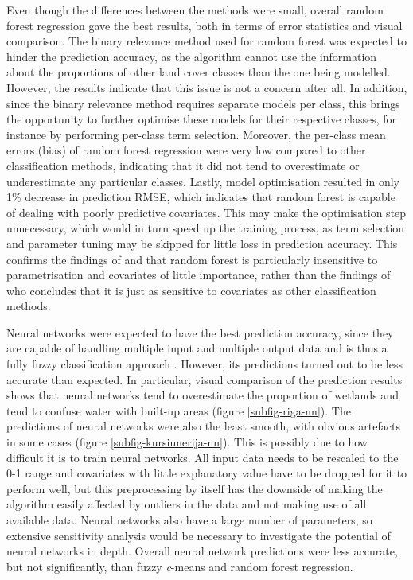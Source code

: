 \documentclass[a4paper,12pt]{scrbook}
\begin{document}
Even though the differences between the methods were small, overall random forest regression gave the best results, both in terms of error statistics and visual comparison. The binary relevance method used for random forest was expected to hinder the prediction accuracy, as the algorithm cannot use the information about the proportions of other land cover classes than the one being modelled. However, the results indicate that this issue is not a concern after all. In addition, since the binary relevance method requires separate models per class, this brings the opportunity to further optimise these models for their respective classes, for instance by performing per-class term selection. Moreover, the per-class mean errors (bias) of random forest regression were very low compared to other classification methods, indicating that it did not tend to overestimate or underestimate any particular classes. Lastly, model optimisation resulted in only 1\% decrease in prediction RMSE, which indicates that random forest is capable of dealing with poorly predictive covariates. This may make the optimisation step unnecessary, which would in turn speed up the training process, as term selection and parameter tuning may be skipped for little loss in prediction accuracy. This confirms the findings of \citet{Pelletier2016hardrf} and \citet{breiman2001random} that random forest is particularly insensitive to parametrisation and covariates of little importance, rather than the findings of \citet{walton2008subpixelrf} who concludes that it is just as sensitive to covariates as other classification methods.

Neural networks were expected to have the best prediction accuracy, since they are capable of handling multiple input and multiple output data and is thus a fully fuzzy classification approach \citep{zhang2001fullyfuzzy}. However, its predictions turned out to be less accurate than expected. In particular, visual comparison of the prediction results shows that neural networks tend to overestimate the proportion of wetlands and tend to confuse water with built-up areas (figure \ref{subfig-riga-nn}). The predictions of neural networks were also the least smooth, with obvious artefacts in some cases (figure \ref{subfig-kursiunerija-nn}). This is possibly due to how difficult it is to train neural networks. All input data needs to be rescaled to the 0-1 range and covariates with little explanatory value have to be dropped for it to perform well, but this preprocessing by itself has the downside of making the algorithm easily affected by outliers in the data and not making use of all available data. Neural networks also have a large number of parameters, so extensive sensitivity analysis would be necessary to investigate the potential of neural networks in depth. Overall neural network predictions were less accurate, but not significantly, than fuzzy \textit{c}-means and random forest regression.
\end{document}
